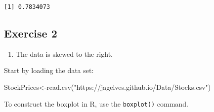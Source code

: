\documentclass[
  letterpaper,
  DIV=11,
  numbers=noendperiod]{scrreprt}
\newenvironment{Shaded}{\begin{snugshade}}{\end{snugshade}}
\newcommand{\AttributeTok}[1]{\textcolor[rgb]{0.40,0.45,0.13}{#1}}
\newcommand{\ConstantTok}[1]{\textcolor[rgb]{0.56,0.35,0.01}{#1}}
\newcommand{\DecValTok}[1]{\textcolor[rgb]{0.68,0.00,0.00}{#1}}
\newcommand{\FloatTok}[1]{\textcolor[rgb]{0.68,0.00,0.00}{#1}}
\newcommand{\FunctionTok}[1]{\textcolor[rgb]{0.28,0.35,0.67}{#1}}
\newcommand{\NormalTok}[1]{\textcolor[rgb]{0.00,0.23,0.31}{#1}}
\newcommand{\OtherTok}[1]{\textcolor[rgb]{0.00,0.23,0.31}{#1}}
\newcommand{\SpecialCharTok}[1]{\textcolor[rgb]{0.37,0.37,0.37}{#1}}
\newcommand{\StringTok}[1]{\textcolor[rgb]{0.13,0.47,0.30}{#1}}
\providecommand{\tightlist}{%
  \setlength{\itemsep}{0pt}\setlength{\parskip}{0pt}}\usepackage{longtable,booktabs,array}
\begin{document}
\begin{verbatim}
[1] 0.7834073
\end{verbatim}

\hypertarget{exercise-2-9}{%
\subsection*{Exercise 2}\label{exercise-2-9}}

\begin{blackbox}

\begin{enumerate}
\def\labelenumi{\arabic{enumi}.}
\tightlist
\item
  The data is skewed to the right.
\end{enumerate}

\end{blackbox}

Start by loading the data set:

\begin{Shaded}
\begin{Highlighting}[numbers=left,,]
\NormalTok{StockPrices}\OtherTok{\textless{}{-}}\FunctionTok{read.csv}\NormalTok{(}\StringTok{"https://jagelves.github.io/Data/Stocks.csv"}\NormalTok{)}
\end{Highlighting}
\end{Shaded}

To construct the boxplot in R, use the \texttt{boxplot()} command.

\begin{Shaded}
\end{Shaded}
\end{document}

